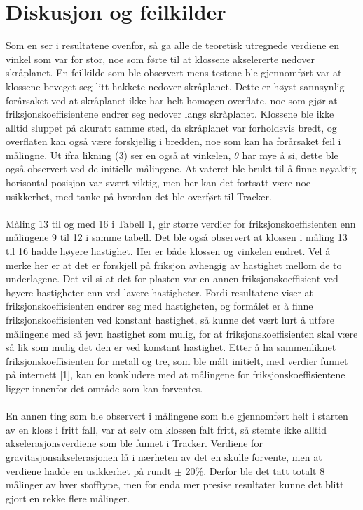 \documentclass[10pt,a4paper]{report}
\begin{document}
\section*{Diskusjon og feilkilder}
Som en ser i resultatene ovenfor, så ga alle de teoretisk utregnede verdiene en vinkel som var for stor, noe som førte til at klossene akselererte nedover skråplanet. En feilkilde som ble observert mens testene ble gjennomført var at klossene beveget seg litt hakkete nedover skråplanet. Dette er høyst sannsynlig forårsaket ved at skråplanet ikke har helt homogen overflate, noe som gjør at friksjonskoeffisientene endrer seg nedover langs skråplanet. Klossene ble ikke alltid sluppet på akuratt samme sted, da skråplanet var forholdsvis bredt, og overflaten kan også være forskjellig i bredden, noe som kan ha forårsaket feil i målingne. Ut ifra likning (3) ser en også at vinkelen, $\theta$ har mye å si, dette ble også observert ved de initielle målingene. At vateret ble brukt til å finne nøyaktig horisontal posisjon var svært viktig, men her kan det fortsatt være noe usikkerhet, med tanke på hvordan det ble overført til Tracker.\\\\
Måling 13 til og med 16 i Tabell 1, gir større verdier for friksjonskoeffisienten enn målingene 9 til 12 i samme tabell. Det ble også observert at klossen i måling 13 til 16 hadde høyere hastighet. Her er både klossen og vinkelen endret. Vel å merke her er at det er forskjell på friksjon avhengig av hastighet mellom de to underlagene. Det vil si at det for plasten var en annen friksjonskoeffisient ved høyere hastigheter enn ved lavere hastigheter. Fordi resultatene viser at friksjonskoeffisienten endrer seg med hastigheten, og formålet er å finne friksjonskoeffisienten ved konstant hastighet, så kunne det vært lurt å utføre målingene med så jevn hastighet som mulig, for at friksjonskoeffisienten skal være så lik som mulig det den er ved konstant hastighet. Etter å ha sammenliknet friksjonskoeffisienten for metall og tre, som ble målt initielt, med verdier funnet på internett [1], kan en konkludere med at målingene for friksjonskoeffisientene ligger innenfor det område som kan forventes.\\\\
En annen ting som ble observert i målingene som ble gjennomført helt i starten av en kloss i fritt fall, var at selv om klossen falt fritt, så stemte ikke alltid akselerasjonsverdiene som ble funnet i Tracker. Verdiene for gravitasjonsakselerasjonen lå i nærheten av det en skulle forvente, men at verdiene hadde en usikkerhet på rundt $\pm$ 20$\%$. Derfor ble det tatt totalt 8 målinger av hver stofftype, men for enda mer presise resultater kunne det blitt gjort en rekke flere målinger.
\end{document}
